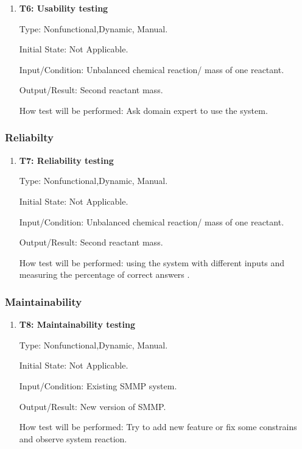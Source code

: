 \documentclass[12pt, titlepage]{article}
\begin{document}
\begin{enumerate}

\item{\bf T6: Usability testing\\}

Type: Nonfunctional,Dynamic, Manual.
					
Initial State:  Not Applicable.
					
Input/Condition:  Unbalanced chemical reaction/ mass of one reactant.
					
Output/Result:  Second reactant mass.
					
How test will be performed: Ask domain expert to use the system.
					

\end{enumerate}

\subsubsection{Reliabilty}


\begin{enumerate}

\item{\bf T7: Reliability testing\\}

Type: Nonfunctional,Dynamic, Manual.
					
Initial State:  Not Applicable.
					
Input/Condition:  Unbalanced chemical reaction/ mass of one reactant.
					
Output/Result:  Second reactant mass.
					
How test will be performed: using the system with different inputs and measuring the percentage of correct answers . 
\end{enumerate}

\subsubsection{Maintainability}


\begin{enumerate}

\item{\bf T8: Maintainability testing\\}

Type: Nonfunctional,Dynamic, Manual.
					
Initial State:  Not Applicable.
					
Input/Condition:  Existing SMMP system.
					
Output/Result:  New version of SMMP.
					
How test will be performed: Try to add new feature or fix some constrains and observe system reaction.

\end{enumerate}
\end{document}
